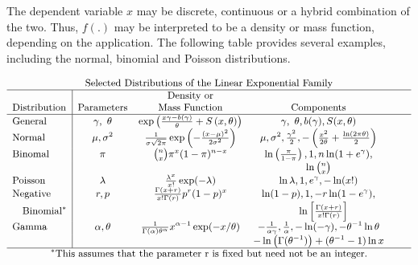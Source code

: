 \documentclass[]{book}
\theoremstyle{definition}
\theoremstyle{definition}
\theoremstyle{definition}
\theoremstyle{remark}
\begin{document}
The dependent variable \(x\) may be discrete, continuous or a hybrid
combination of the two. Thus, \(f\left( .\right)\) may be interpreted to
be a density or mass function, depending on the application. The
following table provides several examples, including the normal,
binomial and Poisson distributions.

\[
{\small
\begin{matrix}
\text{Selected Distributions of the Linear Exponential Family}\\
\begin{array}{l|ccccc}
\hline
             &             & \text{Density or} & & & \\
\text{Distribution} & \text{Parameters} & \text{Mass Function} & \text{Components} \\
\hline \text{General} & \gamma,~ \theta & 
\exp \left( \frac{x\gamma -b(\gamma )}{\theta} +S\left( x,\theta \right) \right) & 
\gamma,~ \theta, b(\gamma), S(x, \theta)\\
 \text{Normal} & \mu, \sigma^2  &
\frac{1}{\sigma \sqrt{2\pi }}\exp \left(-\frac{(x-\mu )^{2}}{2\sigma ^{2}}\right) & 
\mu, \sigma^2, \frac{\gamma^2}{2}, - \left(\frac{x^2}{2\theta} + \frac{\ln(2 \pi
\theta)}{2} \right) \\
\text{Binomal} & \pi & 
{n \choose x} \pi ^x (1-\pi)^{n-x} & 
\ln
\left(\frac{\pi}{1-\pi} \right), 1, n \ln(1+e^{\gamma} ),  \\
&  &  &  \ln {n \choose x} \\
\text{Poisson} & \lambda & 
\frac{\lambda^x}{x!} \exp(-\lambda)  & 
\ln \lambda, 1, e^{\gamma}, - \ln (x!)  \\
\text{Negative } & 
r,p &  \frac{\Gamma(x+r)}{x!\Gamma(r)} p^r ( 1-p)^x & 
\ln(1-p), 1, -r \ln(1-e^{\gamma}), \\
~~~\text{Binomial}^{\ast} & & & ~~~\ln \left[ \frac{\Gamma(x+r)}{x!
\Gamma(r)} \right] \\
\text{Gamma} & \alpha, \theta  & \frac{1}{\Gamma (\alpha)\theta ^ \alpha}
x^{\alpha -1 }\exp(-x/ \theta)  & - \frac{1}{\alpha \gamma},
\frac{1}{\alpha}, - \ln ( - \gamma), -\theta^{-1} \ln \theta \\
& & &  - \ln \left( \Gamma(\theta ^{-1}) \right) +
(\theta^{-1} - 1) \ln x & & \\ \hline
\end{array}\\
^{\ast} \text{This assumes that the parameter r is fixed but need not be an integer.}\\ 
\end{matrix}
}
\]
\end{document}
